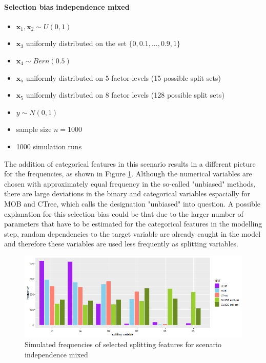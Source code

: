 \paragraph{Selection bias independence mixed}
\begin{itemize}
    \item $\textbf{x}_{1}, \textbf{x}_{2} \sim U(0,1)$ 
    \item $\textbf{x}_3$ uniformly distributed on the set $\{0, 0.1,..., 0.9, 1\}$ 
    \item $\textbf{x}_4  \sim Bern(0.5)$ 
    \item $\textbf{x}_5$ uniformly distributed on 5 factor levels (15 possible split sets) 
    \item $\textbf{x}_5$ uniformly distributed on 8 factor levels (128 possible split sets) %
    \item $y \sim N(0,1)$
    \item sample size $n = 1000$
    \item 1000 simulation runs
\end{itemize}

The addition of categorical features in this scenario results in a different picture for the frequencies, as shown in Figure \ref{fig:selection_bias_independence_mixed}. Although the numerical variables are chosen with approximately equal frequency in the so-called "unbiased" methods, there are large deviations in the binary and categorical variables espacially for MOB and CTree, which calls the designation "unbiased" into question.
A possible explanation for this selection bias could be that due to the larger number of parameters that have to be estimated for the categorical features in the modelling step, random dependencies to the target variable are already caught in the model and therefore these variables are used less frequently as splitting variables.

\begin{figure}[!htb]
    \centering
    \includegraphics[width=16cm]{Figures/simulations/batchtools/selection_bias_general/independence_mixed.png}
    \caption{Simulated frequencies of selected splitting features for scenario independence mixed}
    \label{fig:selection_bias_independence_mixed}
\end{figure}

